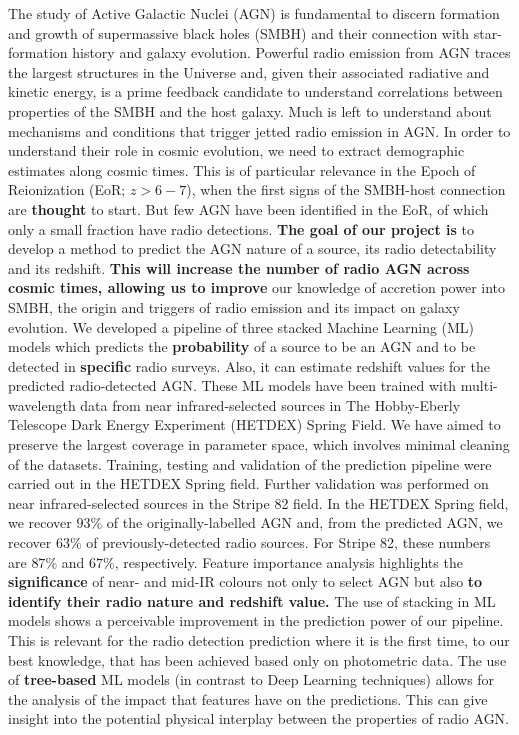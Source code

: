 \documentclass{aa}
\begin{document}
  \abstract
   {The study of Active Galactic Nuclei (AGN) is fundamental to discern formation and growth of supermassive black holes (SMBH) and their connection with star-formation history and galaxy evolution. Powerful radio emission from AGN traces the largest structures in the Universe and, given their associated radiative and kinetic energy, is a prime feedback candidate to understand correlations between properties of the SMBH and the host galaxy. Much is left to understand about mechanisms and conditions that trigger jetted radio emission in AGN. In order to understand their role in cosmic evolution, we need to extract demographic estimates along cosmic times. This is of particular relevance in the Epoch of Reionization (EoR; ${z{>}6-7}$), when the first signs of the SMBH-host connection are \textbf{thought} to start. But few AGN have been identified in the EoR, of which only a small fraction have radio detections.
   }
   {\textbf{The goal of our project is} to develop a method to predict the AGN nature of a source, its radio detectability and its redshift. \textbf{This will increase the number of radio AGN across cosmic times, allowing us to improve} our knowledge of accretion power into SMBH, the origin and triggers of radio emission and its impact on galaxy evolution.   
   }
   {We developed a pipeline of three stacked Machine Learning (ML) models which predicts the \textbf{probability} of a source to be an AGN and to be detected in \textbf{specific} radio surveys. Also, it can estimate redshift values for the predicted radio-detected AGN. These ML models have been trained with multi-wavelength data from near infrared-selected sources in The Hobby-Eberly Telescope Dark Energy Experiment (HETDEX) Spring Field. We have aimed to preserve the largest coverage in parameter space, which involves minimal cleaning of the datasets. Training, testing and validation of the prediction pipeline were carried out in the HETDEX Spring field. Further validation was performed on near infrared-selected sources in the Stripe 82 field.
   }
   {In the HETDEX Spring field, we recover $93\%$ of the originally-labelled AGN and, from the predicted AGN, we recover $63\%$ of previously-detected radio sources. For Stripe 82, these numbers are $87\%$ and $67\%$, respectively. Feature importance analysis highlights the \textbf{significance} of near- and mid-IR colours not only to select AGN but also \textbf{to identify their radio nature and redshift value.}
   }
   {The use of stacking in ML models shows a perceivable improvement in the prediction power of our pipeline. This is relevant for the radio detection prediction where it is the first time, to our best knowledge, that has been achieved based only on photometric data. The use of \textbf{tree-based} ML models (in contrast to Deep Learning techniques) allows for the analysis of the impact that features have on the predictions. This can give insight into the potential physical interplay between the properties of radio AGN.}
\end{document}
